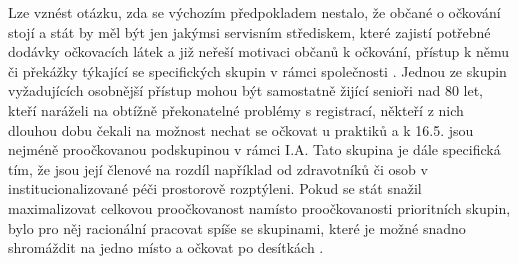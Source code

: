  Lze vznést otázku, zda se výchozím předpokladem nestalo, že občané o očkování stojí a stát by měl být jen jakýmsi servisním střediskem, které zajistí potřebné dodávky očkovacích látek a již neřeší motivaci občanů k očkování, přístup k němu \cite{logoc_zpozdeni} či překážky týkající se specifických skupin v rámci společnosti \cite{logoc_skvrny,logoc_romove}. %
Jednou ze skupin vyžadujících osobnější přístup mohou být samostatně žijící senioři nad 80 let, kteří naráželi na obtížně překonatelné problémy s registrací, někteří z nich dlouhou dobu čekali na možnost nechat se očkovat u praktiků a k 16.5. jsou nejméně proočkovanou podskupinou v rámci I.A. Tato skupina je dále specifická tím, že jsou její členové na rozdíl například od zdravotníků či osob v institucionalizované péči prostorově rozptýleni. Pokud se stát snažil maximalizovat celkovou proočkovanost namísto proočkovanosti prioritních skupin, bylo pro něj racionální pracovat spíše se skupinami, které je možné snadno shromáždit na jedno místo a očkovat po desítkách \cite{blog_ucitele}.  %









